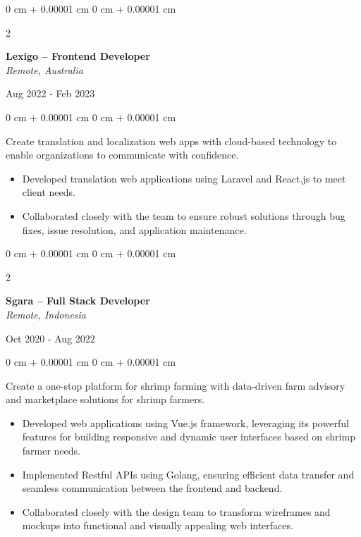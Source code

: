 \documentclass[10pt, letterpaper]{article}
\newenvironment{highlights}{
    \begin{itemize}[
        topsep=0.10 cm,
        parsep=0.10 cm,
        partopsep=0pt,
        itemsep=0pt,
        leftmargin=0 cm + 10pt
    ]
}{
    \end{itemize}
} %
\newenvironment{onecolentry}{
    \begin{adjustwidth}{
        0 cm + 0.00001 cm
    }{
        0 cm + 0.00001 cm
    }
}{
    \end{adjustwidth}
} %
\newenvironment{twocolentry}[2][]{
    \onecolentry
    \def\secondColumn{#2}
    \setcolumnwidth{\fill, 4.5 cm}
    \begin{paracol}{2}
}{
    \switchcolumn \raggedleft \secondColumn
    \end{paracol}
    \endonecolentry
} %
\begin{document}
        \begin{twocolentry}{
            Aug 2022 - Feb 2023
        }
             \textbf{Lexigo -- Frontend Developer} \\
             \textit{Remote, Australia}
            \end{twocolentry}

        \vspace{0.10 cm}
        \begin{onecolentry}
        Create translation and localization web apps with cloud-based technology to enable organizations to communicate with confidence.
            \begin{highlights}
                 \item Developed translation web applications using Laravel and React.js to meet client needs.
                \item Collaborated closely with the team to ensure robust solutions through bug fixes, issue resolution, and application maintenance.
            \end{highlights}
        \end{onecolentry}
        
        \vspace{0.2 cm}
        
        \begin{twocolentry}{
            Oct 2020 - Aug 2022
        }
             \textbf{Sgara -- Full Stack Developer} \\
             \textit{Remote, Indonesia}
            \end{twocolentry}

        \vspace{0.10 cm}
        \begin{onecolentry}
        Create a one-stop platform for shrimp farming with data-driven farm advisory and marketplace solutions for shrimp farmers.
            \begin{highlights}
                \item Developed web applications using Vue.js framework, leveraging its powerful features for building responsive and dynamic user interfaces based on shrimp farmer needs.
                \item Implemented Restful APIs using Golang, ensuring efficient data transfer and seamless communication between the frontend and backend.
                \item Collaborated closely with the design team to transform wireframes and mockups into functional and visually appealing web interfaces.
            \end{highlights}
        \end{onecolentry}
\end{document}
